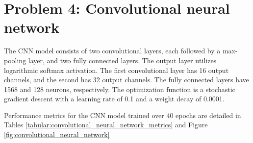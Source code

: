 \documentclass[a4paper]{article}
\begin{document}
\section*{Problem 4: Convolutional neural network}

The CNN model consists of two convolutional layers, each followed by a max-pooling layer, and two fully connected layers. 
The output layer utilizes logarithmic softmax activation. 
The first convolutional layer has 16 output channels, and the second has 32 output channels.
The fully connected layers have 1568 and 128 neurons, respectively.
The optimization function is a stochastic gradient descent with a learning rate of 0.1 and a weight decay of 0.0001.

Performance metrics for the CNN model trained over 40 epochs are detailed in Tables \ref{tabular:convolutional_neural_network_metrics} and Figure \ref{fig:convolutional_neural_network}
\end{document}
